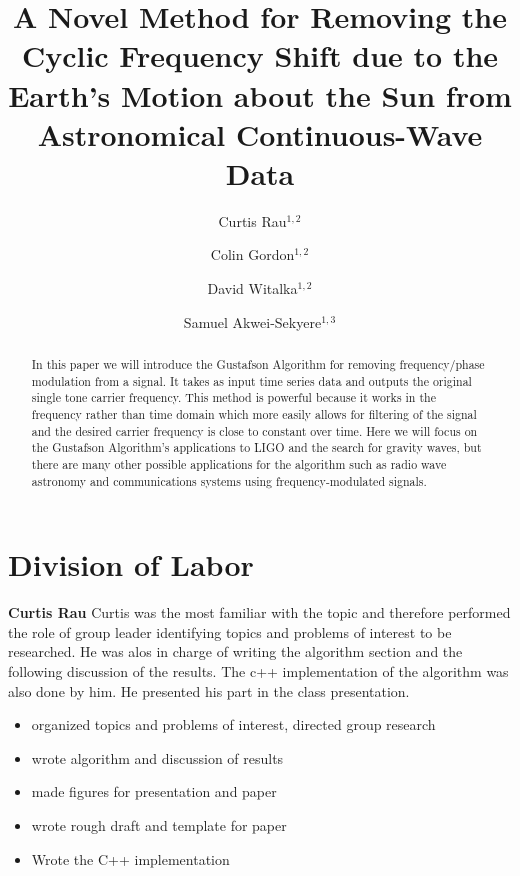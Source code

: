 \documentclass[onecolumn, groupedaddress, 10pt]{revtex4-1}
\begin{document}
\author{Curtis Rau$^{1,2}$}
\author{Colin Gordon$^{1,2}$}
\author{David Witalka$^{1,2}$}
\author{Samuel Akwei-Sekyere$^{1,3}$}

\title{A Novel Method for Removing the Cyclic Frequency Shift due to the Earth's Motion about the Sun from Astronomical Continuous-Wave Data}


\begin{abstract}
In this paper we will introduce the Gustafson Algorithm for removing frequency/phase modulation from a signal.  It takes as input time series data and outputs the original single tone carrier frequency. This method is powerful because it works in the frequency rather than time domain which more easily allows for filtering of the signal and the desired carrier frequency is close to constant over time. Here we will focus on the Gustafson Algorithm's applications to LIGO and the search for gravity waves, but there are many other possible applications for the algorithm such as radio wave astronomy and communications systems using frequency-modulated signals.

\citep{Saulson}
\citep{LSCall}
\citep{Deanna}
\citep{folland}
\citep{griffiths}
\end{abstract}

\maketitle


\pagebreak

\section*{Division of Labor}
\textbf{Curtis Rau}
Curtis was the most familiar with the topic and therefore performed the role of group leader identifying topics and problems of interest to be researched. He was alos in charge of writing the algorithm section and the following discussion of the results. The c++ implementation of the algorithm was also done by him. He presented his part in the class presentation.
\begin{itemize}
\item organized topics and problems of interest, directed group research
\item wrote algorithm and discussion of results
\item made figures for presentation and paper
\item wrote rough draft and template for paper
\item Wrote the C++ implementation
\end{itemize}
\end{document}
